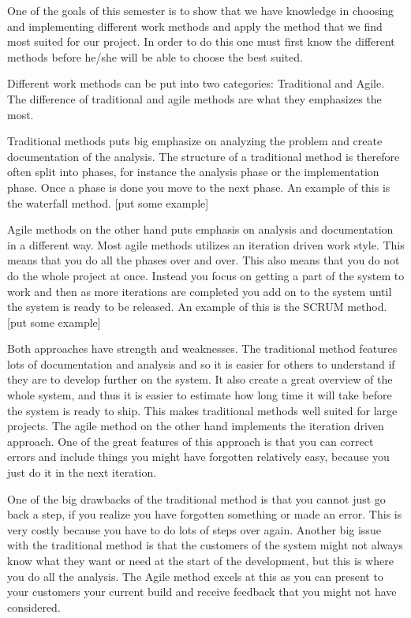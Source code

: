 One of the goals of this semester is to show that we have knowledge in choosing and implementing different work methods and apply the method that we find most suited for our project. In order to do this one must first know the different methods before he/she will be able to choose the best suited. 

Different work methods can be put into two categories: Traditional and Agile.
The difference of traditional and agile methods are what they emphasizes the most.

Traditional methods puts big emphasize on analyzing the problem and create documentation of the analysis. The structure of a traditional method is therefore often split into phases, for instance the analysis phase or the implementation phase. Once a phase is done you move to the next phase. An example of this is the waterfall method. [put some example]

Agile methods on the other hand puts emphasis on analysis and documentation in a different way. Most agile methods utilizes an iteration driven work style. This means that you do all the phases over and over. This also means that you do not do the whole project at once. Instead you focus on getting a part of the system to work and then as more iterations are completed you add on to the system until the system is ready to be released. An example of this is the SCRUM method. [put some example]

Both approaches have strength and weaknesses. The traditional method features lots of documentation and analysis and so it is easier for others to understand if they are to develop further on the system. It also create a great overview of the whole system, and thus it is easier to estimate how long time it will take before the system is ready to ship. This makes traditional methods well suited for large projects. The agile method on the other hand implements the iteration driven approach. One of the great features of this approach is that you can correct errors and include things you might have forgotten relatively easy, because you just do it in the next iteration. 

One of the big drawbacks of the traditional method is that you cannot just go back a step, if you realize you have forgotten something or made an error. This is very costly because you have to do lots of steps over again. Another big issue with the traditional method is that the customers of the system might not always know what they want or need at the start of the development, but this is where you do all the analysis. The Agile method excels at this as you can present to your customers your current build and receive feedback that you might not have considered. 

